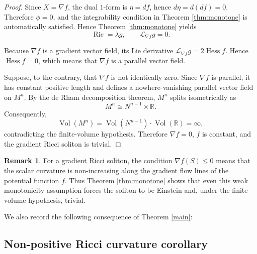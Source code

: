 \documentclass[a4paper, twoside, 10pt]{article}
\numberwithin{equation}{section}
\theoremstyle{definition}
\newtheorem{remark}{Remark}[section]
\begin{document}
\begin{proof}
Since \(X=\nabla f\), the dual $1$-form is
\(\eta=df\), hence \(d\eta=d(df)=0\). Therefore
\(\phi=0\), and the integrability condition in
Theorem \ref{thm:monotone} is automatically satisfied. Hence
Theorem \ref{thm:monotone} yields
\[
\operatorname{Ric}=\lambda g,
\qquad
\mathcal{L}_{\nabla f}g=0.
\]

Because $\nabla f$ is a gradient vector field, its Lie derivative
$\mathcal{L}_{\nabla f}g=2\operatorname{Hess}f$. Hence
$\operatorname{Hess}f=0$, which means that $\nabla f$ is a parallel
vector field.

Suppose, to the contrary, that $\nabla f$ is not identically zero.
Since $\nabla f$ is parallel, it has constant positive length and
defines a nowhere-vanishing parallel vector field on $M^{n}$. By the
de Rham decomposition theorem, $M^{n}$ splits isometrically as
\[
M^{n}\cong N^{n-1}\times\mathbb{R}.
\]
Consequently,
\[
\operatorname{Vol}(M^{n})
=\operatorname{Vol}(N^{n-1})\cdot\operatorname{Vol}(\mathbb{R})
=\infty,
\]
contradicting the finite-volume hypothesis. Therefore
$\nabla f=0$, $f$ is constant, and the gradient Ricci soliton is
trivial.
\end{proof}

\begin{remark}
For a gradient Ricci soliton, the condition
\(\nabla f(S)\le0\) means that the scalar curvature is
non-increasing along the gradient flow lines of the
potential function \(f\). Thus Theorem
\ref{thm:monotone} shows that even this weak monotonicity
assumption forces the soliton to be Einstein and, under the finite-volume hypothesis, trivial.
\end{remark}

\bigskip


We also record the following consequence of Theorem \ref{main}:


\subsection{Non-positive Ricci curvature corollary}
\end{document}
